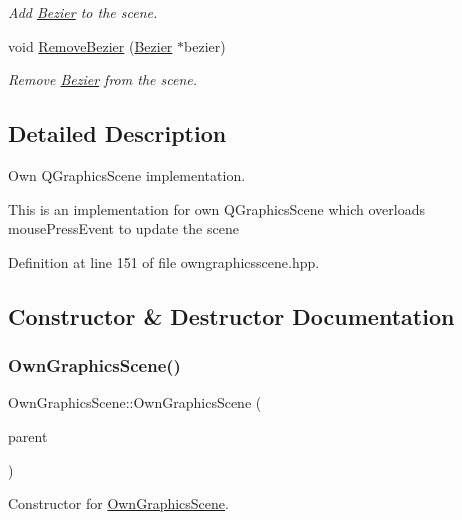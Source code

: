 \begin{DoxyCompactItemize}
\begin{DoxyCompactList}\small\item\em Add \mbox{\hyperlink{classBezier}{Bezier}} to the scene. \end{DoxyCompactList}\item 
void \mbox{\hyperlink{classOwnGraphicsScene_a24d8270608b0bd56c6155d99d7722ab8}{Remove\+Bezier}} (\mbox{\hyperlink{classBezier}{Bezier}} $\ast$bezier)
\begin{DoxyCompactList}\small\item\em Remove \mbox{\hyperlink{classBezier}{Bezier}} from the scene. \end{DoxyCompactList}\end{DoxyCompactItemize}


\subsection{Detailed Description}
Own Q\+Graphics\+Scene implementation. 

This is an implementation for own Q\+Graphics\+Scene which overloads mouse\+Press\+Event to update the scene 

Definition at line 151 of file owngraphicsscene.\+hpp.



\subsection{Constructor \& Destructor Documentation}
\mbox{\label{classOwnGraphicsScene_a242b82147a469314e4c7fb5af69c265f}} 
\subsubsection{\texorpdfstring{Own\+Graphics\+Scene()}{OwnGraphicsScene()}}
{\footnotesize\ttfamily Own\+Graphics\+Scene\+::\+Own\+Graphics\+Scene (\begin{DoxyParamCaption}\item[{Q\+Widget $\ast$}]{parent }\end{DoxyParamCaption})\hspace{0.3cm}{\ttfamily [inline]}}



Constructor for \mbox{\hyperlink{classOwnGraphicsScene}{Own\+Graphics\+Scene}}. 


